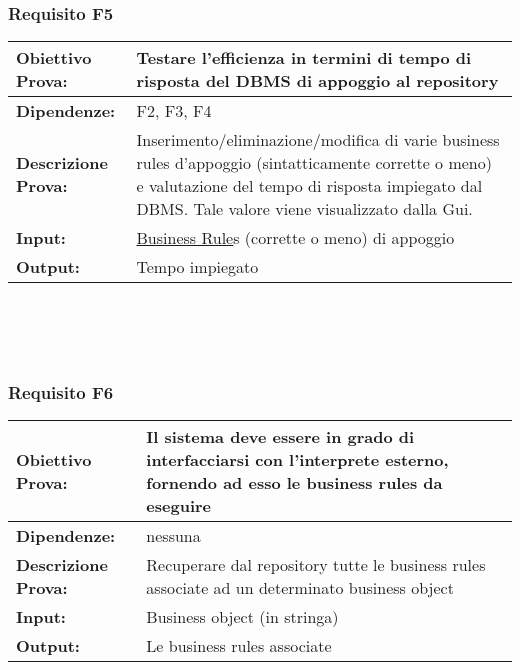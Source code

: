 \subsubsection{Requisito F5}
\begin{tabular}{||p{4cm}||p{8cm}||}
\hline
{\textbf {Obiettivo Prova:}}& Testare l'efficienza in termini di tempo di risposta del DBMS di appoggio al repository \\ \hline
{\textbf{Dipendenze:}}& F2, F3, F4\\ \hline
{\textbf{Descrizione Prova:}}& Inserimento/eliminazione/modifica di varie business rules d'appoggio (sintatticamente corrette o meno) e valutazione del tempo di risposta impiegato dal DBMS. Tale valore viene visualizzato dalla Gui. \\ \hline
{\textbf{Input:}}& \underline{Business Rule}s (corrette o meno) di appoggio  \\ \hline
{\textbf{Output:}}& Tempo impiegato \\ \hline
\end{tabular} \\
\\
\\
\subsubsection{Requisito F6}
\begin{tabular}{||p{4cm}||p{8cm}||}
\hline
{\textbf {Obiettivo Prova:}}& Il sistema deve essere in grado di interfacciarsi con l'interprete esterno, fornendo ad esso le business rules da eseguire \\ \hline
{\textbf{Dipendenze:}}& nessuna \\ \hline
{\textbf{Descrizione Prova:}}&  Recuperare dal repository tutte le business rules associate ad un determinato business object\\ \hline
{\textbf{Input:}}&  Business object (in stringa) \\ \hline
{\textbf{Output:}}& Le business rules associate\\ \hline
\end{tabular} \\
\\
\\
